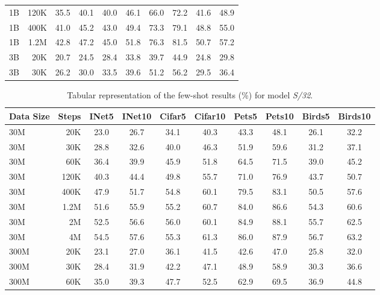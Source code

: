 \begin{table}[t]
\begin{tabulary}{1.0\textwidth}{l r c c c c c c c c}
1B    & 120K  & 35.5 & 40.1 & 40.0 & 46.1 & 66.0 & 72.2 & 41.6 & 48.9 \\
1B    & 400K  & 41.0 & 45.2 & 43.0 & 49.4 & 73.3 & 79.1 & 48.8 & 55.0 \\
1B    & 1.2M  & 42.8 & 47.2 & 45.0 & 51.8 & 76.3 & 81.5 & 50.7 & 57.2 \\
\midrule[0.25pt]
3B    & 20K   & 20.7 & 24.5 & 28.4 & 33.8 & 39.7 & 44.9 & 24.8 & 29.8 \\
3B    & 30K   & 26.2 & 30.0 & 33.5 & 39.6 & 51.2 & 56.2 & 29.5 & 36.4 \\
    \bottomrule
  \end{tabulary}
\end{table}

\begin{table}[t]
  \setlength{\tabcolsep}{5pt}
  \setlength{\extrarowheight}{5pt}
  \renewcommand{\arraystretch}{0.75}
  \centering
  \caption{Tabular representation of the few-shot results (\%) for model \emph{S/32}.}\label{tbl:s_32}
  \begin{tabulary}{1.0\textwidth}{l r c c c c c c c c}
    \toprule[1pt]
    \bf{Data Size} & \bf{Steps} & \bf{INet5} & \bf{INet10} & \bf{Cifar5} & \bf{Cifar10} & \bf{Pets5} & \bf{Pets10} & \bf{Birds5} & \bf{Birds10} \\
    \midrule
30M   & 20K   & 23.0 & 26.7 & 34.1 & 40.3 & 43.3 & 48.1 & 26.1 & 32.2 \\
30M   & 30K   & 28.8 & 32.6 & 40.0 & 46.3 & 51.9 & 59.6 & 31.2 & 37.1 \\
30M   & 60K   & 36.4 & 39.9 & 45.9 & 51.8 & 64.5 & 71.5 & 39.0 & 45.2 \\
30M   & 120K  & 40.3 & 44.4 & 49.8 & 55.7 & 71.0 & 76.9 & 43.7 & 50.7 \\
30M   & 400K  & 47.9 & 51.7 & 54.8 & 60.1 & 79.5 & 83.1 & 50.5 & 57.6 \\
30M   & 1.2M  & 51.6 & 55.9 & 55.2 & 60.7 & 84.0 & 86.6 & 54.3 & 60.6 \\
30M   & 2M    & 52.5 & 56.6 & 56.0 & 60.1 & 84.9 & 88.1 & 55.7 & 62.5 \\
30M   & 4M    & 54.5 & 57.6 & 55.3 & 61.3 & 86.0 & 87.9 & 56.7 & 63.2 \\
\midrule[0.25pt]
300M  & 20K   & 23.1 & 27.0 & 36.1 & 41.5 & 42.6 & 47.0 & 25.8 & 32.0 \\
300M  & 30K   & 28.4 & 31.9 & 42.2 & 47.1 & 48.9 & 58.9 & 30.3 & 36.6 \\
300M  & 60K   & 35.0 & 39.3 & 47.7 & 52.5 & 62.9 & 69.5 & 36.9 & 44.8 \\

\end{tabulary}
\end{table}

